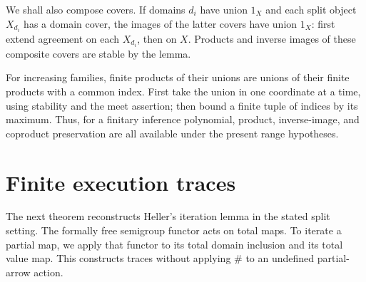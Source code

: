 \documentclass[11pt]{article}
\theoremstyle{definition}\newtheorem{definition}[theorem]{Definition}
\theoremstyle{remark}\newtheorem{remark}[theorem]{Remark}
\begin{document}
We shall also compose covers. If domains $d_i$ have union $1_X$
and each split object $X_{d_i}$ has a domain cover, the images of
the latter covers have union $1_X$: first extend agreement on each
$X_{d_i}$, then on $X$. Products and inverse images of these
composite covers are stable by the lemma.

For increasing families, finite products of their unions are unions
of their finite products with a common index. First take the union
in one coordinate at a time, using stability and the meet assertion;
then bound a finite tuple of indices by its maximum. Thus, for a
finitary inference polynomial, product, inverse-image, and coproduct
preservation are all available under the present range hypotheses.

\section{Finite execution traces}\label{sec:traces}

The next theorem reconstructs Heller's iteration lemma
\cite[Lemma~7.1]{Heller} in the stated split setting.
The formally free semigroup functor acts on total maps. To iterate
a partial map, we apply that functor to its total domain inclusion
and its total value map. This constructs traces without applying
$\#$ to an undefined partial-arrow action.
\end{document}
